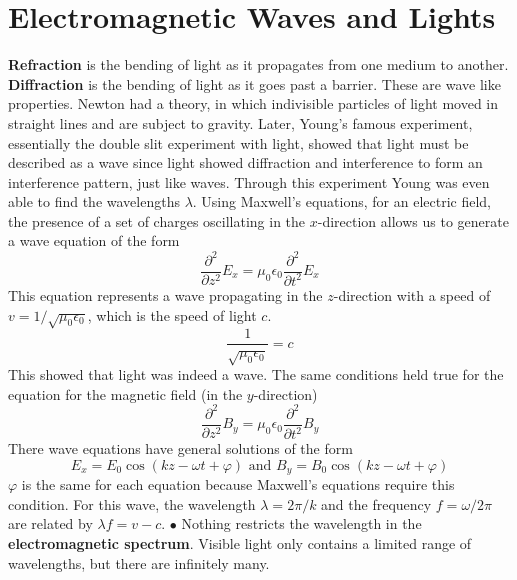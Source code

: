 \section{Electromagnetic Waves and Lights}
    \textbf{Refraction} is the bending of light as it propagates from one medium to another. \textbf{Diffraction} is the bending of light as it goes past a barrier. These are wave like properties. 
    \newline \indent
    Newton had a theory, in which indivisible particles of light moved in straight lines and are subject to gravity. Later, Young's famous experiment, essentially the double slit experiment with light, showed that light must be described as a wave since light showed diffraction and interference to form an interference pattern, just like waves. Through this experiment Young was even able to find the wavelengths $\lambda$.
    \newline \indent
    Using Maxwell's equations, for an electric field, the presence of a set of charges oscillating in the $x$-direction allows us to generate a wave equation of the form
    \begin{equation*}
        \frac{\partial^2}{\partial z^2} E_x = \mu_0\epsilon_0\frac{\partial^2}{\partial t^2} E_x
    \end{equation*}
    This equation represents a wave propagating in the $z$-direction with a speed of $v = 1 / \sqrt{\mu_0\epsilon_0}$, which is the speed of light $c$.
    \begin{equation*}
        \frac{1}{\sqrt{\mu_0\epsilon_0}} = c
    \end{equation*} 
    This showed that light was indeed a wave. The same conditions held true for the equation for the magnetic field (in the $y$-direction)
    \begin{equation*}
        \frac{\partial^2}{\partial z^2} B_y = \mu_0\epsilon_0\frac{\partial^2}{\partial t^2} B_y
    \end{equation*}
    There wave equations have general solutions of the form
    \begin{equation*}
        E_x = E_0\cos(kz - \omega t + \varphi) \text{ and  } B_y = B_0\cos(kz - \omega t + \varphi)
    \end{equation*}
    $\varphi$ is the same for each equation because Maxwell's equations require this condition. For this wave, the wavelength $\lambda = 2\pi / k$ and the frequency $f = \omega / 2\pi$ are related by $\lambda f = v - c$.
    \newline \indent $\bullet$
    Nothing restricts the wavelength in the \textbf{electromagnetic spectrum}. Visible light only contains a limited range of wavelengths, but there are infinitely many.
